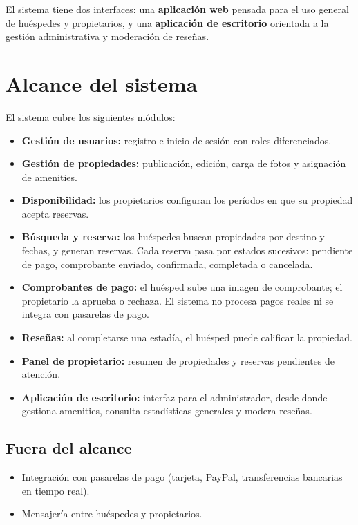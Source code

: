 \documentclass[12pt,a4paper]{article}
\begin{document}
El sistema tiene dos interfaces: una \textbf{aplicación web} pensada para el uso general de
huéspedes y propietarios, y una \textbf{aplicación de escritorio} orientada a la gestión
administrativa y moderación de reseñas.

\section{Alcance del sistema}

El sistema cubre los siguientes módulos:

\begin{itemize}[leftmargin=1.5em]
  \item \textbf{Gestión de usuarios:} registro e inicio de sesión con roles diferenciados.
  \item \textbf{Gestión de propiedades:} publicación, edición, carga de fotos y asignación de amenities.
  \item \textbf{Disponibilidad:} los propietarios configuran los períodos en que su propiedad acepta reservas.
  \item \textbf{Búsqueda y reserva:} los huéspedes buscan propiedades por destino y fechas, y generan reservas. Cada reserva pasa por estados sucesivos: pendiente de pago, comprobante enviado, confirmada, completada o cancelada.
  \item \textbf{Comprobantes de pago:} el huésped sube una imagen de comprobante; el propietario la aprueba o rechaza. El sistema no procesa pagos reales ni se integra con pasarelas de pago.
  \item \textbf{Reseñas:} al completarse una estadía, el huésped puede calificar la propiedad.
  \item \textbf{Panel de propietario:} resumen de propiedades y reservas pendientes de atención.
  \item \textbf{Aplicación de escritorio:} interfaz para el administrador, desde donde gestiona amenities, consulta estadísticas generales y modera reseñas.
\end{itemize}

\subsection{Fuera del alcance}

\begin{itemize}[leftmargin=1.5em]
  \item Integración con pasarelas de pago (tarjeta, PayPal, transferencias bancarias en tiempo real).
  \item Mensajería entre huéspedes y propietarios.
\end{itemize}
\end{document}
